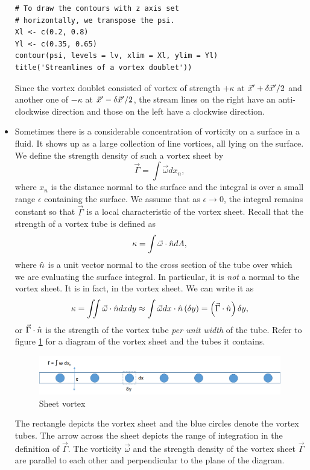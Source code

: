 \begin{itemize}
\begin{verbatim}
# To draw the contours with z axis set 
# horizontally, we transpose the psi.
Xl <- c(0.2, 0.8)
Yl <- c(0.35, 0.65)
contour(psi, levels = lv, xlim = Xl, ylim = Yl)
title('Streamlines of a vortex doublet'))
\end{verbatim}

Since the vortex doublet consisted of vortex of strength $+\kappa$ at $\vec{x}^\prime + \delta\vec{x}^\prime/2$ and another one of $-\kappa$ at $\vec{x}^\prime - \delta\vec{x}^\prime/2$, the stream
lines on the right have an anti-clockwise direction and those on the left have a clockwise direction.

\item Sometimes there is a considerable concentration of vorticity on a surface in a fluid. It shows up as a large collection of line vortices, all lying on the surface. We define the 
strength density of such a vortex sheet by
\[
\vec{\Gamma} = \int\vec{\omega}dx_n,
\]
where $x_n$ is the distance normal to the surface and the integral is over a small range $\epsilon$ containing the surface. We assume that as $\epsilon \rightarrow 0$, the integral
remains constant so that $\vec{\Gamma}$ is a local characteristic of the vortex sheet. Recall that the strength of a vortex tube is defined as 
\[
\kappa = \int\vec{\omega}\cdot\hat{n} dA,
\]
where $\hat{n}$ is a unit vector normal to the cross section of the tube over which we are evaluating the surface integral. In particular, it is \emph{not} a normal to the vortex sheet. It
is in fact, in the vortex sheet. We can write it as
\[
\kappa = \iint\vec{\omega}\cdot\hat{n} dx dy \approx \int\vec{\omega}dx \cdot \hat{n} \left(\delta y\right) = \left(\vec{\Gamma}\cdot\hat{n}\right)\delta y,
\]
or $\vec{\Gamma}\cdot\hat{n}$ is the strength of the vortex tube \emph{per unit width} of the tube. Refer to figure \ref{c2f5} for a diagram of the vortex sheet and the tubes it contains.
\begin{figure}[!ht]
\centering
\centerline{\includegraphics[scale=.35]{c2f5}}
\caption{Sheet vortex}
\label{c2f5}
\end{figure}
The rectangle depicts the vortex sheet and the blue circles denote the vortex tubes. The arrow across the sheet depicts the range of integration in the definition of $\vec{\Gamma}$. The
vorticity $\vec{\omega}$ and the strength density of the vortex sheet $\vec{\Gamma}$ are parallel to each other and perpendicular to the plane of the diagram.


\end{itemize}

